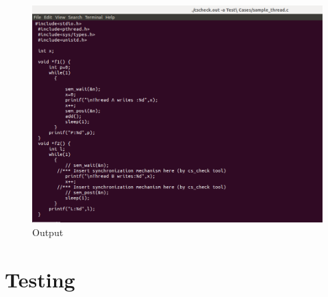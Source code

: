 \begin{figure}[H]
\centering
\includegraphics[scale=0.4]{Snaps/lckunlck_comment.png}
\caption{ Output }
\label{<<Label>>}
\end{figure}



\section{Testing}

